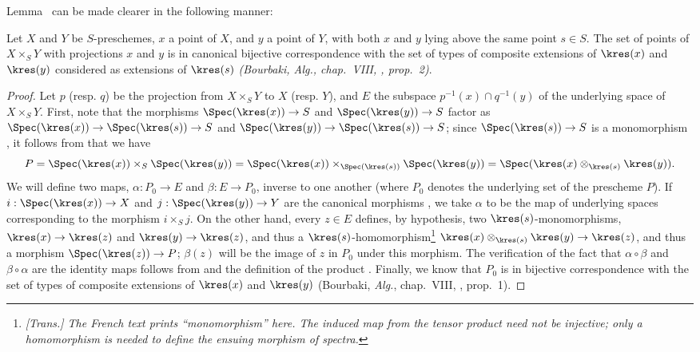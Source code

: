 Lemma~ can be made clearer in the following manner:
\begin{proposition}[3.4.9]
\label{I.3.4.9}
Let $X$ and $Y$ be $S$-preschemes, $x$ a point of $X$, and $y$ a point of $Y$, with both $x$ and $y$ lying above the same point $s\in S$.
The set of points of $X\times_S Y$ with projections $x$ and $y$ is in canonical bijective correspondence with the set of types of composite extensions of $\kres(x)$ and $\kres(y)$ considered as extensions of $\kres(s)$ \emph{(Bourbaki, \emph{Alg.}, chap.~VIII, , prop.~2)}.
\end{proposition}

\begin{proof}
Let $p$ (resp. $q$) be the projection from $X\times_S Y$ to $X$ (resp. $Y$), and $E$ the subspace $p^{-1}(x)\cap q^{-1}(y)$ of the underlying space of $X\times_S Y$.
First, note that the morphisms $\Spec(\kres(x))\to S$ and $\Spec(\kres(y))\to S$ factor as $\Spec(\kres(x))\to\Spec(\kres(s))\to S$ and $\Spec(\kres(y))\to\Spec(\kres(s))\to S$; since $\Spec(\kres(s))\to S$ is a monomorphism , it follows from  that we have
\[
  P=\Spec(\kres(x))\times_S\Spec(\kres(y))=\Spec(\kres(x))\times_{\Spec(\kres(s))}\Spec(\kres(y))=\Spec(\kres(x)\otimes_{\kres(s)}\kres(y)).
\]
We will define two maps, $\alpha:P_0\to E$ and $\beta:E\to P_0$, inverse to one another (where $P_0$ denotes the underlying set of the prescheme $P$).
If $i:\Spec(\kres(x))\to X$ and $j:\Spec(\kres(y))\to Y$ are the canonical morphisms , we take $\alpha$ to be the map of underlying spaces corresponding to the morphism $i\times_S j$.
On the other hand, every $z\in E$ defines, by hypothesis, two $\kres(s)$-monomorphisms, $\kres(x)\to\kres(z)$ and $\kres(y)\to\kres(z)$, and thus a $\kres(s)$-homomorphism\footnote{\emph{[Trans.] The French text prints ``monomorphism'' here. The induced map from the tensor product need not be injective; only a homomorphism is needed to define the ensuing morphism of spectra.}} $\kres(x)\otimes_{\kres(s)}\kres(y)\to\kres(z)$, and thus a morphism $\Spec(\kres(z))\to P$; $\beta(z)$ will be the image of $z$ in $P_0$ under this morphism.
The verification of the fact that $\alpha\circ\beta$ and $\beta\circ\alpha$ are the identity maps follows from  and the definition of the product .
Finally, we know that $P_0$ is in bijective correspondence with the set of types of composite extensions of $\kres(x)$ and $\kres(y)$ (Bourbaki, \emph{Alg.}, chap.~VIII, , prop.~1).
\end{proof}

